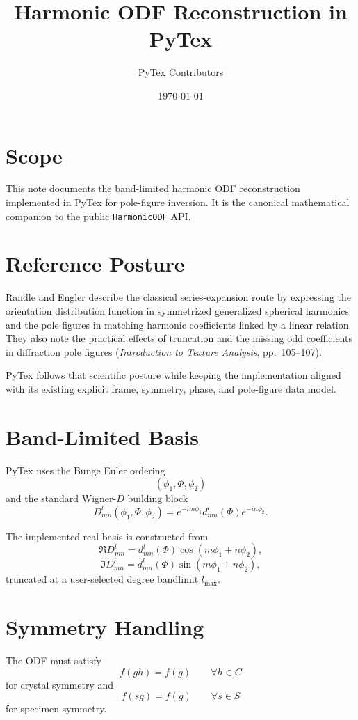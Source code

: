 \documentclass[11pt]{article}
\title{Harmonic ODF Reconstruction in PyTex}
\author{PyTex Contributors}
\date{\today}
\begin{document}
\maketitle

\section{Scope}

This note documents the band-limited harmonic ODF reconstruction implemented in PyTex for
pole-figure inversion. It is the canonical mathematical companion to the public
\texttt{HarmonicODF} API.

\section{Reference Posture}

Randle and Engler describe the classical series-expansion route by expressing the
orientation distribution function in symmetrized generalized spherical harmonics and the
pole figures in matching harmonic coefficients linked by a linear relation. They also
note the practical effects of truncation and the missing odd coefficients in diffraction
pole figures (\textit{Introduction to Texture Analysis}, pp.\ 105--107).

PyTex follows that scientific posture while keeping the implementation aligned with its
existing explicit frame, symmetry, phase, and pole-figure data model.

\section{Band-Limited Basis}

PyTex uses the Bunge Euler ordering
\[
  (\phi_1, \Phi, \phi_2)
\]
and the standard Wigner-\(D\) building block
\[
  D^l_{mn}(\phi_1,\Phi,\phi_2)
  =
  e^{- i m \phi_1}
  d^l_{mn}(\Phi)
  e^{- i n \phi_2}.
\]

The implemented real basis is constructed from
\[
  \Re D^l_{mn}
  =
  d^l_{mn}(\Phi)\cos(m\phi_1 + n\phi_2),
\]
\[
  \Im D^l_{mn}
  =
  d^l_{mn}(\Phi)\sin(m\phi_1 + n\phi_2),
\]
truncated at a user-selected degree bandlimit \(l_{\max}\).

\section{Symmetry Handling}

The ODF must satisfy
\[
  f(g h) = f(g)
  \qquad \forall h \in C
\]
for crystal symmetry and
\[
  f(s g) = f(g)
  \qquad \forall s \in S
\]
for specimen symmetry.
\end{document}
